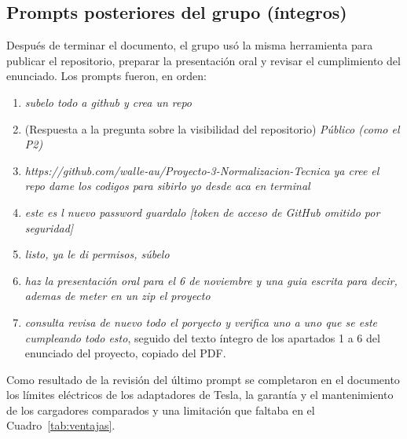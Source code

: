 \subsection*{Prompts posteriores del grupo (íntegros)}
Después de terminar el documento, el grupo usó la misma herramienta para publicar el repositorio, preparar la presentación oral y revisar el cumplimiento del enunciado. Los prompts fueron, en orden:
\begin{enumerate}
\item \textit{subelo todo a github y crea un repo}
\item (Respuesta a la pregunta sobre la visibilidad del repositorio) \textit{Público (como el P2)}
\item \textit{https://github.com/walle-au/Proyecto-3-Normalizacion-Tecnica ya cree el repo dame los codigos para sibirlo yo desde aca en terminal}
\item \textit{este es l nuevo password guardalo [token de acceso de GitHub omitido por seguridad]}
\item \textit{listo, ya le di permisos, súbelo}
\item \textit{haz la presentación oral para el 6 de noviembre y una guia escrita para decir, ademas de meter en un zip el proyecto}
\item \textit{consulta revisa de nuevo todo el poryecto y verifica uno a uno que se este cumpleando todo esto}, seguido del texto íntegro de los apartados 1 a 6 del enunciado del proyecto, copiado del PDF.
\end{enumerate}
Como resultado de la revisión del último prompt se completaron en el documento los límites eléctricos de los adaptadores de Tesla, la garantía y el mantenimiento de los cargadores comparados y una limitación que faltaba en el Cuadro~\ref{tab:ventajas}.

